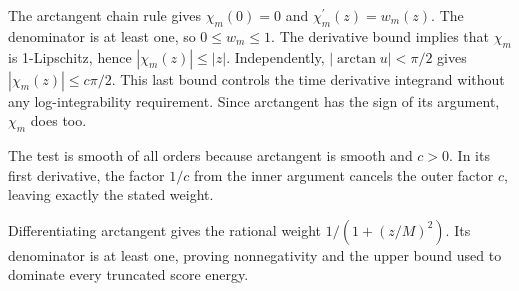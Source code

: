 \documentclass[11pt,a4paper]{report}
\begin{document}
The arctangent chain rule gives \(\chi_m(0)=0\) and \(\chi_m^{\prime}(z)=w_m(z)\). The denominator is at least one, so \(0\le w_m\le1\). The derivative bound implies that \(\chi_m\) is 1-Lipschitz, hence \(|\chi_m(z)|\le|z|\). Independently, \(|\arctan u|<\pi/2\) gives \(|\chi_m(z)|\le c\pi/2\). This last bound controls the time derivative integrand without any log-integrability requirement. Since arctangent has the sign of its argument, \(\chi_m\) does too.



The test is smooth of all orders because arctangent is smooth and \(c>0\). In its first derivative, the factor \(1/c\) from the inner argument cancels the outer factor \(c\), leaving exactly the stated weight.



Differentiating arctangent gives the rational weight \(1/(1+(z/M)^2)\). Its denominator is at least one, proving nonnegativity and the upper bound used to dominate every truncated score energy.
\end{document}
